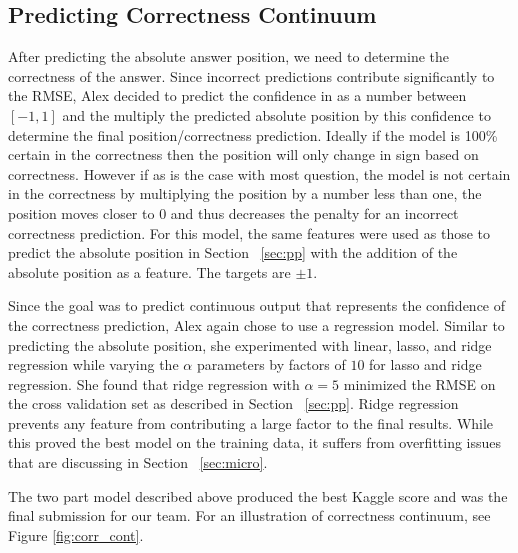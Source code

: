 \documentclass[letterpaper]{article}
\begin{document}
\subsection{Predicting Correctness Continuum}
\label{sec:pc}
After predicting the absolute answer position, we need to determine the correctness of the answer.  Since incorrect predictions contribute significantly to the RMSE, Alex decided to predict the confidence in as a number between $[-1,1]$ and the multiply the predicted absolute position by this confidence to determine the final position/correctness prediction.  Ideally if the model is 100\% certain in the correctness then the position will only change in sign based on correctness.  However if as is the case with most question, the model is not certain in the correctness by multiplying the position by a number less than one, the position moves closer to 0 and thus decreases the penalty for an incorrect correctness prediction.  For this model, the same features were used as those to predict the absolute position in Section ~\ref{sec:pp} with the addition of the absolute position as a feature.  The targets are $\pm 1$.

Since the goal was to predict continuous output that represents the confidence of the correctness prediction, Alex again chose to use a regression model.  Similar to predicting the absolute position, she experimented with linear, lasso, and ridge regression while varying the $\alpha$ parameters by factors of $10$ for lasso and ridge regression.  She found that ridge regression with $\alpha=5$ minimized the RMSE on the cross validation set as described in Section ~\ref{sec:pp}.  Ridge regression prevents any feature from contributing a large factor to the final results.  While this proved the best model on the training data, it suffers from overfitting issues that are discussing in Section ~\ref{sec:micro}.

The two part model described above produced the best Kaggle score and was the final submission for our team.  For an illustration of correctness continuum, see Figure \ref{fig:corr_cont}.  
\end{document}
